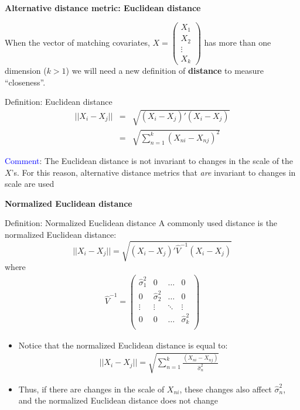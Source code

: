 \documentclass[notes=show]{beamer}
\newcommand*\colvec[1]{\begin{pmatrix}#1\end{pmatrix}}
\begin{document}
\begin{frame}[plain]
	\begin{center}
	\textbf{Alternative distance metric: Euclidean distance}
	\end{center}
	
 When the vector of matching covariates, $X= \colvec{X_1\\X_2\\\vdots\\X_k}$ has more than one dimension ($k>1$) we will need a new definition of \textbf{distance} to measure ``closeness''.  
	
	\begin{block}{Definition: Euclidean distance}
	\begin{eqnarray*}
	||X_i-X_j|| &=& \sqrt{ (X_i-X_j)'(X_i-X_j) } \\
	&=& \sqrt{ \sum_{n=1}^k (X_{ni} - X_{nj})^2 }
	\end{eqnarray*}
	\end{block}
	
\textcolor{blue}{Comment}: The Euclidean distance is not invariant to changes in the scale of the $X$'s.  For this reason, alternative distance metrics that \emph{are} invariant to changes in scale are used
	
\end{frame}


\begin{frame}[plain, shrink=20]
	\begin{center}
	\textbf{Normalized Euclidean distance}
	\end{center}
	
	\begin{block}{Definition: Normalized Euclidean distance}
	A commonly used distance is the normalized Euclidean distance:$$||X_i-X_j|| = \sqrt{ (X_i-X_j)'\widehat{V}^{-1}(X_i - X_j) }$$where
		\begin{eqnarray*}
		\widehat{V}^{-1} = \begin{pmatrix}
						\widehat{\sigma}_1^2 & 0 & \dots & 0 \\
						0 & \widehat{\sigma}_2^2 & \dots & 0 \\
						\vdots & \vdots & \ddots & \vdots \\
						0 & 0 & \dots & \widehat{\sigma}_k^2 \\
 					    \end{pmatrix}
		\end{eqnarray*}
	\end{block}

	\begin{itemize}
	\item Notice that the normalized Euclidean distance is equal to:
		\begin{eqnarray*}
		||X_i - X_j|| = \sqrt{\sum_{n=1}^k \frac{(X_{ni} - X_{nj})}{\widehat{\sigma}^2_n}}
		\end{eqnarray*}
	\item Thus, if there are changes in the scale of $X_{ni}$, these changes also affect $\widehat{\sigma}^2_n$, and the normalized Euclidean distance does not change
	\end{itemize}

\end{frame}
\end{document}
